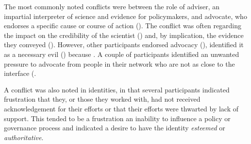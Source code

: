 The most commonly noted conflicts were between the role of adviser, an impartial interpreter of science and evidence for policymakers, and advocate, who endorses a specific cause or course of action (). The conflict was often regarding the impact on the credibility of the scientist () and, by implication, the evidence they conveyed (). However, other participants endorsed advocacy (), identified it as a necessary evil () because . A couple of participants identified an unwanted pressure to advocate from people in their network who are not as close to the interface (.

A conflict was also noted in identities, in that several participants indicated frustration that they, or those they worked with, had not received acknowledgement for their efforts or that their efforts were thwarted by lack of support. This tended to be a frustration an inability to influence a policy or governance process and indicated a desire to have the identity \emph{esteemed} or \emph{authoritative}.

